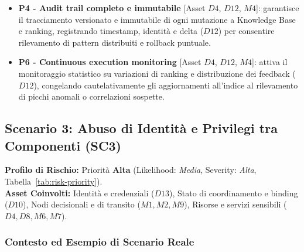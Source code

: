 \documentclass[11pt,a4paper]{article}
\begin{document}
\begin{itemize}
    \item \textbf{P4 - Audit trail completo e immutabile} [Asset $D4$, $D12$, $M4$]:
    garantisce il tracciamento versionato e immutabile di ogni mutazione a Knowledge Base e ranking, registrando timestamp, identità e delta ($D12$) per consentire rilevamento di pattern distribuiti e rollback puntuale.

    \item \textbf{P6 - Continuous execution monitoring} [Asset $D4$, $D12$, $M4$]:
    attiva il monitoraggio statistico su variazioni di ranking e distribuzione dei feedback ($D12$), congelando cautelativamente gli aggiornamenti all'indice al rilevamento di picchi anomali o correlazioni sospette.
\end{itemize}

\subsection{Scenario 3: Abuso di Identità e Privilegi tra Componenti (SC3)}
\label{sec:sc3}

\noindent\textbf{Profilo di Rischio:} Priorità \textbf{Alta} (Likelihood: \emph{Media}, Severity: \emph{Alta}, Tabella~\ref{tab:risk-priority}).\\
\textbf{Asset Coinvolti:} Identità e credenziali ($D13$), Stato di coordinamento e binding ($D10$), Nodi decisionali e di transito ($M1, M2, M9$), Risorse e servizi sensibili ($D4, D8, M6, M7$).

\subsubsection{Contesto ed Esempio di Scenario Reale}
\end{document}
